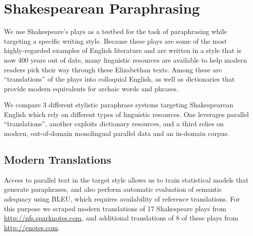\documentclass[10pt,a5paper,twoside]{article}
\begin{document}

\section{Shakespearean Paraphrasing}
We use Shakespeare's plays as a testbed for the task of paraphrasing while targeting a specific writing style.  Because these plays are some of 
the most highly-regarded examples of English literature and 
are written in a style that is now 400 years out of date, many linguistic resources are available to help modern readers pick their way through 
these Elizabethan texts. Among these are “translations” of the plays into colloquial English, as well as dictionaries that provide modern equivalents for archaic words and phrases.

We compare 3 different stylistic paraphrase systems targeting Shakespearean English which rely on different types of linguistic resources. 
One leverages parallel “translations”, another exploits dictionary resources, and a third relies on modern, out-of-domain monolingual parallel data and an in-domain corpus.

\subsection{Modern Translations}
\label{modern_translations}
Access to parallel text in the target style allows us to train statistical models that generate paraphrases, and also perform automatic evaluation of semantic adequacy using BLEU, which requires availability of reference translations.  For this purpose we scraped modern translations of 17 Shakespeare plays from \url{http://nfs.sparknotes.com}, and 
additional translations of 8 of these plays from \url{http://enotes.com}.
\end{document}
